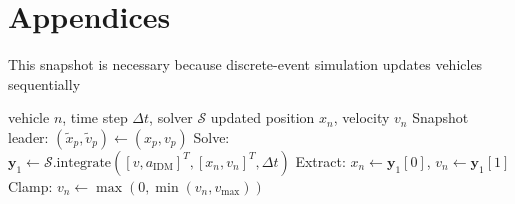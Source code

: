 \documentclass{scspaperproc}
\theoremstyle{scsthe}
\begin{document}
\section{Appendices} \label{app:quadratic}
This snapshot is necessary because discrete-event simulation updates vehicles sequentially
\begin{algorithm}
\caption{Per-Vehicle State Update}
\begin{algorithmic}[1]
\Require vehicle $n$, time step $\Delta t$, solver $\mathcal{S}$
\Ensure updated position $x_n$, velocity $v_n$
\State Snapshot leader: $(\tilde{x}_p, \tilde{v}_p) \gets (x_p, v_p)$
\State Solve: $\mathbf{y}_1 \gets \mathcal{S}.\text{integrate}([v, a_{\text{IDM}}]^T, [x_n, v_n]^T, \Delta t)$
\State Extract: $x_n \gets \mathbf{y}_1[0]$, $v_n \gets \mathbf{y}_1[1]$
\State Clamp: $v_n \gets \max(0, \min(v_n, v_{\max}))$
\end{algorithmic}
\end{algorithm}





\end{document}
